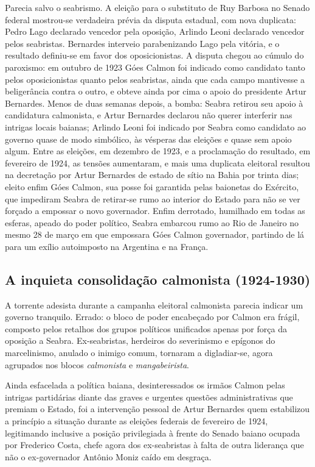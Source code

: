 Parecia salvo o seabrismo. A eleição para o substituto de Ruy Barbosa no Senado federal mostrou-se verdadeira prévia da disputa estadual, com nova duplicata: Pedro Lago declarado vencedor pela oposição, Arlindo Leoni declarado vencedor pelos seabristas. Bernardes interveio parabenizando Lago pela vitória, e o resultado definiu-se em favor dos oposicionistas. A disputa chegou ao cúmulo do paroxismo: em outubro de 1923 Góes Calmon foi indicado como candidato tanto pelos oposicionistas quanto pelos seabristas, ainda que cada campo mantivesse a beligerância contra o outro, e obteve ainda por cima o apoio do presidente Artur Bernardes. Menos de duas semanas depois, a bomba: Seabra retirou seu apoio à candidatura calmonista, e Artur Bernardes declarou não querer interferir nas intrigas locais baianas; Arlindo Leoni foi indicado por Seabra como candidato ao governo quase de modo simbólico, às vésperas das eleições e quase sem apoio algum. Entre as eleições, em dezembro de 1923, e a proclamação do resultado, em fevereiro de 1924, as tensões aumentaram, e mais uma duplicata eleitoral resultou na decretação por Artur Bernardes de estado de sítio na Bahia por trinta dias; eleito enfim Góes Calmon, sua posse foi garantida pelas baionetas do Exército, que impediram Seabra de retirar-se rumo ao interior do Estado para não se ver forçado a empossar o novo governador. Enfim derrotado, humilhado em todas as esferas, apeado do poder político, Seabra embarcou rumo ao Rio de Janeiro no mesmo 28 de março em que empossara Góes Calmon governador, partindo de lá para um exílio autoimposto na Argentina e na França.

\subsection{A inquieta consolidação calmonista (1924-1930)}

A torrente adesista durante a campanha eleitoral calmonista parecia indicar um governo tranquilo. Errado: o bloco de poder encabeçado por Calmon era frágil, composto pelos retalhos dos grupos políticos unificados apenas por força da oposição a Seabra. Ex-seabristas, herdeiros do severinismo e epígonos do marcelinismo, anulado o inimigo comum, tornaram a digladiar-se, agora agrupados nos blocos \textit{calmonista} e \textit{mangabeirista}. 

Ainda esfacelada a política baiana, desinteressados os irmãos Calmon pelas intrigas partidárias diante das graves e urgentes questões administrativas que premiam o Estado, foi a intervenção pessoal de Artur Bernardes quem estabilizou a princípio a situação durante as eleições federais de fevereiro de 1924, legitimando inclusive a posição privilegiada à frente do Senado baiano ocupada por Frederico Costa, chefe agora dos ex-seabristas à falta de outra liderança que não o ex-governador Antônio Moniz caído em desgraça. 


